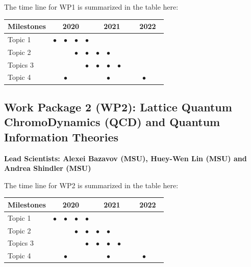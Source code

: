 \documentclass[10pt]{article}
\begin{document}
The time line for WP1 is summarized in the table here:
\begin{footnotesize}
\begin{center}
\begin{tabular}{|l|c|c|c|c|c|c|c|c|c|c|c|c|}
\hline
\multicolumn{1}{|l}{Milestones } & \multicolumn{4}{|c|}{ 2020 } & \multicolumn{4}{c|}{ 2021 } & \multicolumn{4}{c|}{ 2022 } \\
\hline
Topic 1 &$\bullet$ &$\bullet$ &$\bullet$ &$\bullet$ & & & & & & & &  \\
\hline
Topic 2 & & &$\bullet$ &$\bullet$ &$\bullet$ &$\bullet$ & & & & & &  \\
\hline
Topics 3 & & & & $\bullet$ &$\bullet$ &$\bullet$ &$\bullet$ & & & & &  \\
\hline
Topic 4 & &$\bullet$ & & & &$\bullet$ & & & &$\bullet$ & &  \\
\hline
\end{tabular}
\end{center}
\end{footnotesize}

\subsection{Work Package 2 (WP2): Lattice Quantum ChromoDynamics (QCD) and Quantum Information Theories}
{\bf Lead Scientists: Alexei Bazavov (MSU), Huey-Wen Lin (MSU) and Andrea Shindler (MSU)}


The time line for WP2 is summarized in the table here:
\begin{footnotesize}
\begin{center}
\begin{tabular}{|l|c|c|c|c|c|c|c|c|c|c|c|c|}
\hline
\multicolumn{1}{|l}{Milestones } & \multicolumn{4}{|c|}{ 2020 } & \multicolumn{4}{c|}{ 2021 } & \multicolumn{4}{c|}{ 2022 } \\
\hline
Topic 1 &$\bullet$ &$\bullet$ &$\bullet$ &$\bullet$ & & & & & & & &  \\
\hline
Topic 2 & & &$\bullet$ &$\bullet$ &$\bullet$ &$\bullet$ & & & & & &  \\
\hline
Topics 3 & & & & $\bullet$ &$\bullet$ &$\bullet$ &$\bullet$ & & & & &  \\
\hline
Topic 4 & &$\bullet$ & & & &$\bullet$ & & & &$\bullet$ & &  \\
\hline

\end{tabular}
\end{center}
\end{footnotesize}
\end{document}
